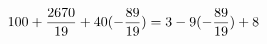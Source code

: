 \documentclass[preview]{standalone}
\begin{document}
\begin{align*}
\special{dvisvgm:raw <g id='unique000'>}100 + \frac{2670}{19} + 40 (- \frac{89}{19}) = 3 - 9 (- \frac{89}{19}) + 8\special{dvisvgm:raw </g>}
\end{align*}
\end{document}
